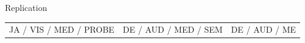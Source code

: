 \documentclass[final]{beamer}
\begin{document}
\begin{frame}{}
\begin{textblock}{67}
\begin{block}{Replication}
\begin{tabular}{c c c}
JA / VIS / MED / PROBE & DE / AUD / MED / SEM  & DE / AUD / ME
\end{tabular}
\end{block}
\end{textblock}
\end{frame}
\end{document}
